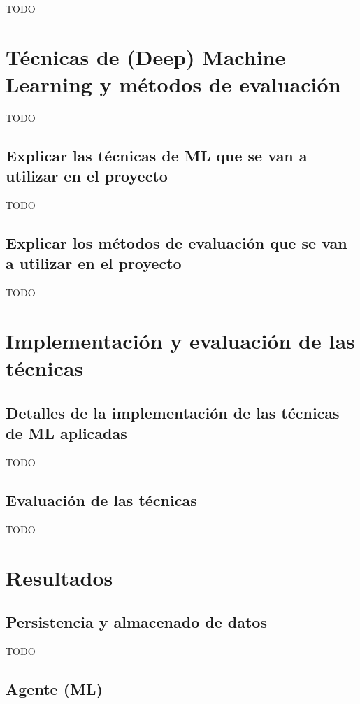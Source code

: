 \documentclass[]{article}
\begin{document}
TODO


\section{Técnicas de (Deep) Machine Learning y métodos de evaluación}

TODO


\subsection{Explicar las técnicas de ML que se van a utilizar en el proyecto}

TODO

\subsection{Explicar los métodos de evaluación que se van a utilizar en el proyecto}

TODO


\section{Implementación y evaluación de las técnicas}

\subsection{Detalles de la implementación de las técnicas de ML aplicadas}

TODO

\subsection{Evaluación de las técnicas}

TODO


\section{Resultados}

\subsection{Persistencia y almacenado de datos}

TODO

\subsection{Agente (ML)}
\end{document}
